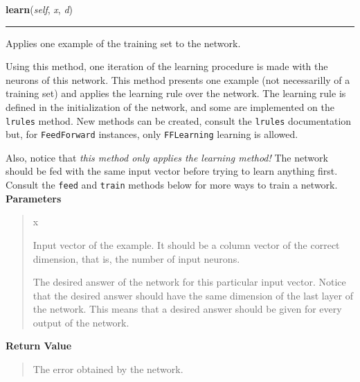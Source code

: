     \vspace{0.5ex}

\hspace{.8\funcindent}\begin{boxedminipage}{\funcwidth}

    \raggedright \textbf{learn}(\textit{self}, \textit{x}, \textit{d})

    \vspace{-1.5ex}

    \rule{\textwidth}{0.5\fboxrule}
\setlength{\parskip}{2ex}

Applies one example of the training set to the network.

Using this method, one iteration of the learning procedure is made with
the neurons of this network. This method presents one example (not
necessarilly of a training set) and applies the learning rule over the
network. The learning rule is defined in the initialization of the
network, and some are implemented on the \texttt{lrules} method. New methods
can be created, consult the \texttt{lrules} documentation but, for
\texttt{FeedForward} instances, only \texttt{FFLearning} learning is allowed.

Also, notice that \emph{this method only applies the learning method!} The
network should be fed with the same input vector before trying to learn
anything first. Consult the \texttt{feed} and \texttt{train} methods below for
more ways to train a network.
\setlength{\parskip}{1ex}
      \textbf{Parameters}
      \vspace{-1ex}

      \begin{quote}
        \begin{Ventry}{x}

          \item[x]


Input vector of the example. It should be a column vector of the
correct dimension, that is, the number of input neurons.
          \item[d]


The desired answer of the network for this particular input vector.
Notice that the desired answer should have the same dimension of the
last layer of the network. This means that a desired answer should
be given for every output of the network.
        \end{Ventry}

      \end{quote}

      \textbf{Return Value}
    \vspace{-1ex}

      \begin{quote}

The error obtained by the network.
      \end{quote}

    \end{boxedminipage}

